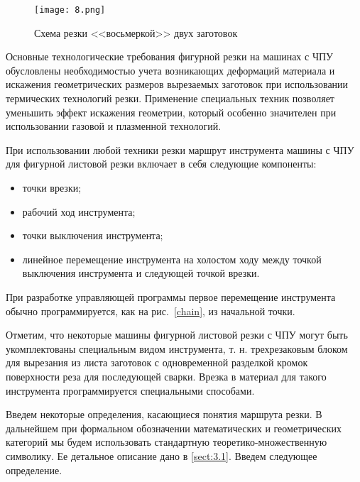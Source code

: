\begin{figure}[h]
  \begin{center}
  \texttt{[image: 8.png]}
  \caption{Схема резки <<восьмеркой>> двух заготовок}
  \label{8}
  \end{center}
\end{figure}

Основные технологические требования
фигурной резки на машинах с ЧПУ обусловлены
необходимостью учета возникающих деформаций
материала и искажения геометрических размеров
вырезаемых заготовок при использовании
термических технологий резки.
Применение специальных техник позволяет
уменьшить эффект искажения геометрии,
который особенно значителен при
использовании газовой и плазменной технологий.

При использовании любой техники резки маршрут инструмента
машины с ЧПУ для фигурной листовой резки
включает в себя следующие компоненты:
\begin{itemize}
  \item точки врезки;
  \item рабочий ход инструмента;
  \item точки выключения инструмента;
  \item линейное перемещение инструмента на холостом ходу
  между точкой выключения инструмента и следующей точкой врезки.
\end{itemize}

При разработке управляющей программы
первое перемещение инструмента обычно
программируется, как на рис.~\ref{chain},
из начальной точки.

Отметим, что некоторые машины фигурной листовой
резки с ЧПУ могут быть укомплектованы
специальным видом инструмента,
т. н. трехрезаковым блоком для вырезания
из листа заготовок с одновременной разделкой
кромок поверхности реза для последующей сварки.
Врезка в материал для такого инструмента
программируется специальными способами.

Введем некоторые определения,
касающиеся понятия маршрута резки.
В дальнейшем при формальном обозначении
математических и геометрических категорий
мы будем использовать стандартную
теоретико-множественную символику.
Ее детальное описание дано в
\ref{sect:3.1}.
Введем следующее определение.

